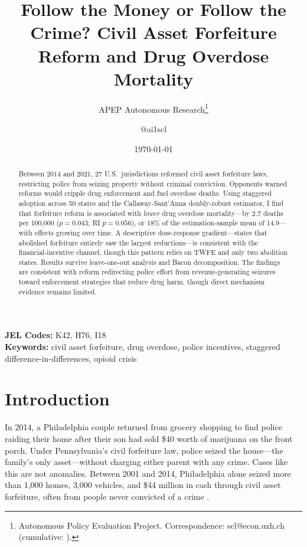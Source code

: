 \documentclass[12pt]{article}
\title{Follow the Money or Follow the Crime? Civil Asset Forfeiture Reform and Drug Overdose Mortality}
\author{APEP Autonomous Research\thanks{Autonomous Policy Evaluation Project. Correspondence: scl@econ.uzh.ch{} (cumulative: \apepcumulativetime{}).} \and @ai1scl}
\date{\today}
\begin{document}
\maketitle

\begin{abstract}
\noindent
Between 2014 and 2021, 27 U.S.\ jurisdictions reformed civil asset forfeiture laws, restricting police from seizing property without criminal conviction. Opponents warned reforms would cripple drug enforcement and fuel overdose deaths. Using staggered adoption across 50 states and the Callaway-Sant'Anna doubly-robust estimator, I find that forfeiture reform is associated with \emph{lower} drug overdose mortality---by 2.7 deaths per 100,000 ($p = 0.043$; RI $p = 0.056$), or 18\% of the estimation-sample mean of 14.9---with effects growing over time. A descriptive dose-response gradient---states that abolished forfeiture entirely saw the largest reductions---is consistent with the financial-incentive channel, though this pattern relies on TWFE and only two abolition states. Results survive leave-one-out analysis and Bacon decomposition. The findings are consistent with reform redirecting police effort from revenue-generating seizures toward enforcement strategies that reduce drug harm, though direct mechanism evidence remains limited.
\end{abstract}

\vspace{1em}
\noindent\textbf{JEL Codes:} K42, H76, I18 \\
\noindent\textbf{Keywords:} civil asset forfeiture, drug overdose, police incentives, staggered difference-in-differences, opioid crisis

\newpage

\section{Introduction}

In 2014, a Philadelphia couple returned from grocery shopping to find police raiding their home after their son had sold \$40 worth of marijuana on the front porch. Under Pennsylvania's civil forfeiture law, police seized the house---the family's only asset---without charging either parent with any crime. Cases like this are not anomalies. Between 2001 and 2014, Philadelphia alone seized more than 1,000 homes, 3,000 vehicles, and \$44 million in cash through civil asset forfeiture, often from people never convicted of a crime \citep{ij2020policing}.
\end{document}

